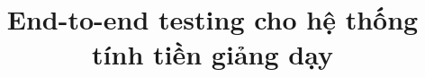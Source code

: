 \documentclass[twoside,final]{phenikaa-report}
\title{End-to-end testing cho hệ thống tính tiền giảng dạy}
\begin{document}
\coverpage%

\tableofcontents
\listoffigures
\listoftables
\lstlistoflistings

\clearpage










\nocite{*}
\end{document}
